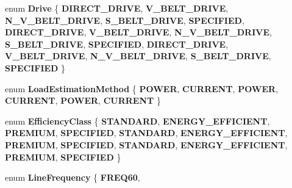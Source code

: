 \begin{DoxyCompactItemize}
enum {\bfseries Drive} \{ \newline
{\bfseries D\+I\+R\+E\+C\+T\+\_\+\+D\+R\+I\+VE}, 
{\bfseries V\+\_\+\+B\+E\+L\+T\+\_\+\+D\+R\+I\+VE}, 
{\bfseries N\+\_\+\+V\+\_\+\+B\+E\+L\+T\+\_\+\+D\+R\+I\+VE}, 
{\bfseries S\+\_\+\+B\+E\+L\+T\+\_\+\+D\+R\+I\+VE}, 
\newline
{\bfseries S\+P\+E\+C\+I\+F\+I\+ED}, 
{\bfseries D\+I\+R\+E\+C\+T\+\_\+\+D\+R\+I\+VE}, 
{\bfseries V\+\_\+\+B\+E\+L\+T\+\_\+\+D\+R\+I\+VE}, 
{\bfseries N\+\_\+\+V\+\_\+\+B\+E\+L\+T\+\_\+\+D\+R\+I\+VE}, 
\newline
{\bfseries S\+\_\+\+B\+E\+L\+T\+\_\+\+D\+R\+I\+VE}, 
{\bfseries S\+P\+E\+C\+I\+F\+I\+ED}, 
{\bfseries D\+I\+R\+E\+C\+T\+\_\+\+D\+R\+I\+VE}, 
{\bfseries V\+\_\+\+B\+E\+L\+T\+\_\+\+D\+R\+I\+VE}, 
\newline
{\bfseries N\+\_\+\+V\+\_\+\+B\+E\+L\+T\+\_\+\+D\+R\+I\+VE}, 
{\bfseries S\+\_\+\+B\+E\+L\+T\+\_\+\+D\+R\+I\+VE}, 
{\bfseries S\+P\+E\+C\+I\+F\+I\+ED}
 \}
\item 
\mbox{\label{struct_motor_a6f8326215d659b4e6961510281e4af4b}} 
enum {\bfseries Load\+Estimation\+Method} \{ \newline
{\bfseries P\+O\+W\+ER}, 
{\bfseries C\+U\+R\+R\+E\+NT}, 
{\bfseries P\+O\+W\+ER}, 
{\bfseries C\+U\+R\+R\+E\+NT}, 
\newline
{\bfseries P\+O\+W\+ER}, 
{\bfseries C\+U\+R\+R\+E\+NT}
 \}
\item 
\mbox{\label{struct_motor_afa022971ae062406a9f588c601673d4e}} 
enum {\bfseries Efficiency\+Class} \{ \newline
{\bfseries S\+T\+A\+N\+D\+A\+RD}, 
{\bfseries E\+N\+E\+R\+G\+Y\+\_\+\+E\+F\+F\+I\+C\+I\+E\+NT}, 
{\bfseries P\+R\+E\+M\+I\+UM}, 
{\bfseries S\+P\+E\+C\+I\+F\+I\+ED}, 
\newline
{\bfseries S\+T\+A\+N\+D\+A\+RD}, 
{\bfseries E\+N\+E\+R\+G\+Y\+\_\+\+E\+F\+F\+I\+C\+I\+E\+NT}, 
{\bfseries P\+R\+E\+M\+I\+UM}, 
{\bfseries S\+P\+E\+C\+I\+F\+I\+ED}, 
\newline
{\bfseries S\+T\+A\+N\+D\+A\+RD}, 
{\bfseries E\+N\+E\+R\+G\+Y\+\_\+\+E\+F\+F\+I\+C\+I\+E\+NT}, 
{\bfseries P\+R\+E\+M\+I\+UM}, 
{\bfseries S\+P\+E\+C\+I\+F\+I\+ED}
 \}
\item 
\mbox{\label{struct_motor_acee1bdf1b684ad36cb80dc2829d9fcee}} 
enum {\bfseries Line\+Frequency} \{ \newline
{\bfseries F\+R\+E\+Q60}, 

\end{DoxyCompactItemize}

